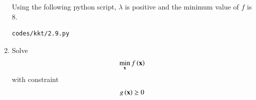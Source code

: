 \begin{enumerate}[label=\thesubsection.\arabic*,ref=\thesubsection.\theenumi]
%
\solution
Using the following python script, $\lambda$ is positive and the minimum value of $f$ is 8.
%	
\begin{lstlisting}
codes/kkt/2.9.py
\end{lstlisting}

%
%
\item
\label{kkt-ch2_prob_upper_cond}
Solve
	 \begin{align}
	\min_{\mathbf{x}} f\left(\mathbf{x}\right) 
	 \end{align}
	 with constraint
	 \begin{align}
	 g\left(\mathbf{x}\right) 
\geq 0 
	 \end{align}
	 

\end{enumerate}
